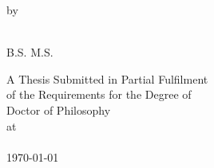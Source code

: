 \pagestyle{empty}
\newpage
\addtocounter{page}{-1}
\begin{center}
\vspace*{2cm}
\huge{ \bf \ttitle}
\end{center}

\vspace{20mm}
\begin{center}
by

\vspace{10mm}
{\bf \authorname}\\
B.S. \textit{\bsunivname} M.S. \textit{\msunivname}
\end{center}

\vspace{30mm}
\begin{center}
A Thesis Submitted in Partial Fulfilment \\
of the Requirements for the Degree of \\
Doctor of Philosophy \\
\vspace{10mm}
at \\
\vspace{10mm}
\univname\\
\monthyeardate\today
\end{center}